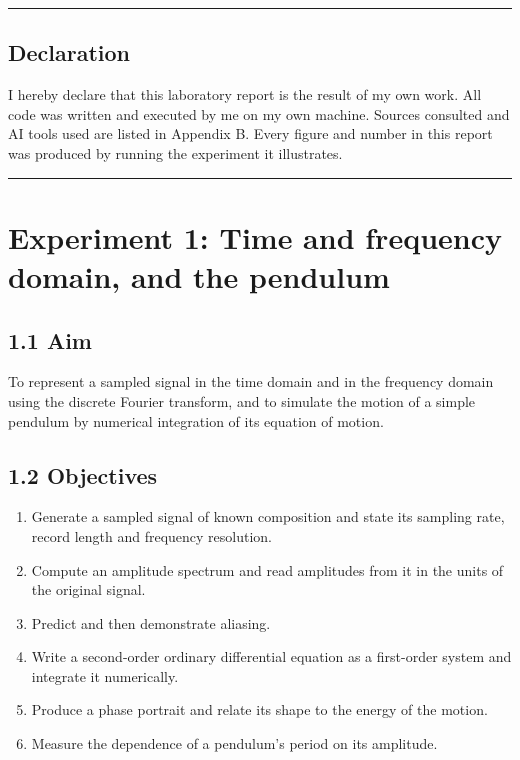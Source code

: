 \documentclass[
]{article}
\providecommand{\tightlist}{%
  \setlength{\itemsep}{0pt}\setlength{\parskip}{0pt}}
\begin{document}
\begin{center}\rule{0.5\linewidth}{0.5pt}\end{center}

\newpage
{}

\subsection{Declaration}\label{declaration}

I hereby declare that this laboratory report is the result of my own
work. All code was written and executed by me on my own machine. Sources
consulted and AI tools used are listed in Appendix B. Every figure and
number in this report was produced by running the experiment it
illustrates.

\begin{center}\rule{0.5\linewidth}{0.5pt}\end{center}

\section{Experiment 1: Time and frequency domain, and the
pendulum}\label{experiment-1-time-and-frequency-domain-and-the-pendulum}

\subsection{1.1 Aim}\label{aim}

To represent a sampled signal in the time domain and in the frequency
domain using the discrete Fourier transform, and to simulate the motion
of a simple pendulum by numerical integration of its equation of motion.

\subsection{1.2 Objectives}\label{objectives}

\begin{enumerate}
\def\labelenumi{\arabic{enumi}.}
\tightlist
\item
  Generate a sampled signal of known composition and state its sampling
  rate, record length and frequency resolution.
\item
  Compute an amplitude spectrum and read amplitudes from it in the units
  of the original signal.
\item
  Predict and then demonstrate aliasing.
\item
  Write a second-order ordinary differential equation as a first-order
  system and integrate it numerically.
\item
  Produce a phase portrait and relate its shape to the energy of the
  motion.
\item
  Measure the dependence of a pendulum's period on its amplitude.
\end{enumerate}
\end{document}
